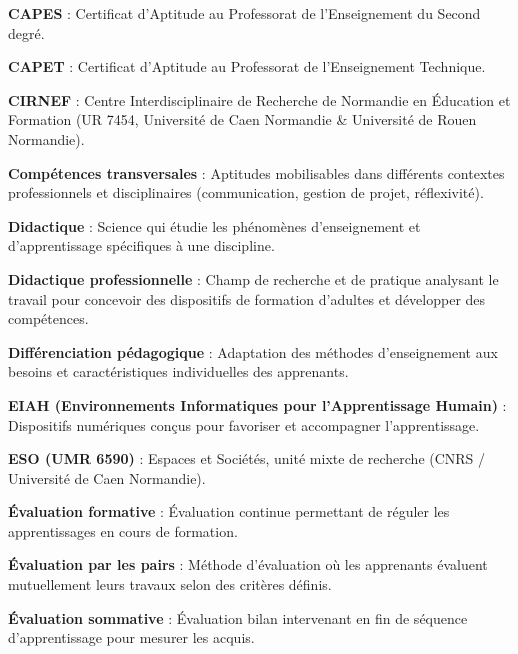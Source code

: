 \documentclass[12pt,a4paper]{report}
\begin{document}
\begin{tcolorbox}[colback=white,colframe=headercolor,title=\textbf{C},fonttitle=\large\bfseries]
\textbf{CAPES} : Certificat d'Aptitude au Professorat de l'Enseignement du Second degré.

\textbf{CAPET} : Certificat d'Aptitude au Professorat de l'Enseignement Technique.

\textbf{CIRNEF} : Centre Interdisciplinaire de Recherche de Normandie en Éducation et Formation (UR 7454, Université de Caen Normandie \& Université de Rouen Normandie).

\textbf{Compétences transversales} : Aptitudes mobilisables dans différents contextes professionnels et disciplinaires (communication, gestion de projet, réflexivité).
\end{tcolorbox}

\begin{tcolorbox}[colback=white,colframe=headercolor,title=\textbf{D},fonttitle=\large\bfseries]
\textbf{Didactique} : Science qui étudie les phénomènes d'enseignement et d'apprentissage spécifiques à une discipline.

\textbf{Didactique professionnelle} : Champ de recherche et de pratique analysant le travail pour concevoir des dispositifs de formation d'adultes et développer des compétences.

\textbf{Différenciation pédagogique} : Adaptation des méthodes d'enseignement aux besoins et caractéristiques individuelles des apprenants.
\end{tcolorbox}

\begin{tcolorbox}[colback=white,colframe=headercolor,title=\textbf{E},fonttitle=\large\bfseries]
\textbf{EIAH (Environnements Informatiques pour l'Apprentissage Humain)} : Dispositifs numériques conçus pour favoriser et accompagner l'apprentissage.

\textbf{ESO (UMR 6590)} : Espaces et Sociétés, unité mixte de recherche (CNRS / Université de Caen Normandie).

\textbf{Évaluation formative} : Évaluation continue permettant de réguler les apprentissages en cours de formation.

\textbf{Évaluation par les pairs} : Méthode d'évaluation où les apprenants évaluent mutuellement leurs travaux selon des critères définis.

\textbf{Évaluation sommative} : Évaluation bilan intervenant en fin de séquence d'apprentissage pour mesurer les acquis.
\end{tcolorbox}
\end{document}

